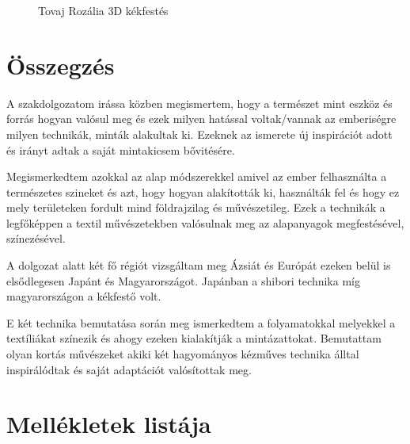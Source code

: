 \documentclass[fontsize=12pt, appendixprefix=true]{scrreprt}
\begin{document}
\begin{figure}[h!]
\begin{subfigure}[b]{0.3\linewidth}
		\caption{}
	  \end{subfigure}
	\caption{Tovaj Rozália 3D kékfestés}
	\label{fig:tr}
  \end{figure}

\chapter{Összegzés} 
A szakdolgozatom irássa közben megismertem, hogy a természet mint eszköz és forrás hogyan valósul meg és ezek milyen hatással voltak/vannak az emberiségre milyen technikák, minták alakultak ki.
Ezeknek az ismerete új inspirációt adott és irányt adtak a saját mintakicsem bővitésére.

Megismerkedtem azokkal az alap módszerekkel amivel az ember felhasználta a természetes szineket és azt, hogy hogyan alakították ki, használták fel és hogy ez mely területeken fordult mind földrajzilag és művészetileg.
Ezek a technikák a legfőképpen a textil művészetekben valósulnak meg az alapanyagok megfestésével, színezésével.

A dolgozat alatt két fő régiót vizsgáltam meg Ázsiát és Európát ezeken belül is elsődlegesen Japánt és Magyarországot. Japánban a shibori technika míg magyarországon  a kékfestő volt.

E két technika bemutatása során meg ismerkedtem a folyamatokkal melyekkel a textíliákat színezik és ahogy ezeken kialakítják a mintázattokat.
Bemutattam olyan kortás művészeket akiki  két hagyományos kézműves technika álltal inspirálódtak és saját adaptációt valósítottak meg.






\renewcommand{\appendixname}{Függelék}  %
\appendix
\chapter{Mellékletek listája}
\end{document}
